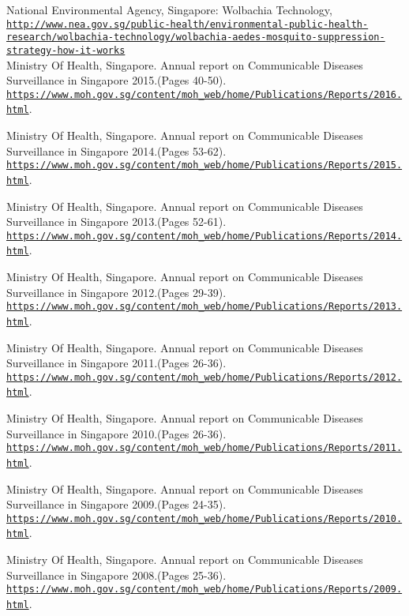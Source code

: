 \documentclass[11pt]{exam}
\begin{document}
\begin{thebibliography}{28}
National Environmental Agency, Singapore: Wolbachia Technology,  
\\\texttt{\url{http://www.nea.gov.sg/public-health/environmental-public-health-research/wolbachia-technology/wolbachia-aedes-mosquito-suppression-strategy-how-it-works}} \\

Ministry Of Health, Singapore. Annual report on Communicable Diseases Surveillance in Singapore 2015.(Pages 40-50).
\\\texttt{\url{https://www.moh.gov.sg/content/moh_web/home/Publications/Reports/2016.html}}.

Ministry Of Health, Singapore. Annual report on Communicable Diseases Surveillance in Singapore 2014.(Pages 53-62).
\\\texttt{\url{https://www.moh.gov.sg/content/moh_web/home/Publications/Reports/2015.html}}.

Ministry Of Health, Singapore. Annual report on Communicable Diseases Surveillance in Singapore 2013.(Pages 52-61).
\\\texttt{\url{https://www.moh.gov.sg/content/moh_web/home/Publications/Reports/2014.html}}.

Ministry Of Health, Singapore. Annual report on Communicable Diseases Surveillance in Singapore 2012.(Pages 29-39).
\\\texttt{\url{https://www.moh.gov.sg/content/moh_web/home/Publications/Reports/2013.html}}.

Ministry Of Health, Singapore. Annual report on Communicable Diseases Surveillance in Singapore 2011.(Pages 26-36).
\\\texttt{\url{https://www.moh.gov.sg/content/moh_web/home/Publications/Reports/2012.html}}.

Ministry Of Health, Singapore. Annual report on Communicable Diseases Surveillance in Singapore 2010.(Pages 26-36).
\\\texttt{\url{https://www.moh.gov.sg/content/moh_web/home/Publications/Reports/2011.html}}.

Ministry Of Health, Singapore. Annual report on Communicable Diseases Surveillance in Singapore 2009.(Pages 24-35).
\\\texttt{\url{https://www.moh.gov.sg/content/moh_web/home/Publications/Reports/2010.html}}.

Ministry Of Health, Singapore. Annual report on Communicable Diseases Surveillance in Singapore 2008.(Pages 25-36).
\\\texttt{\url{https://www.moh.gov.sg/content/moh_web/home/Publications/Reports/2009.html}}.


\end{thebibliography}
\end{document}
